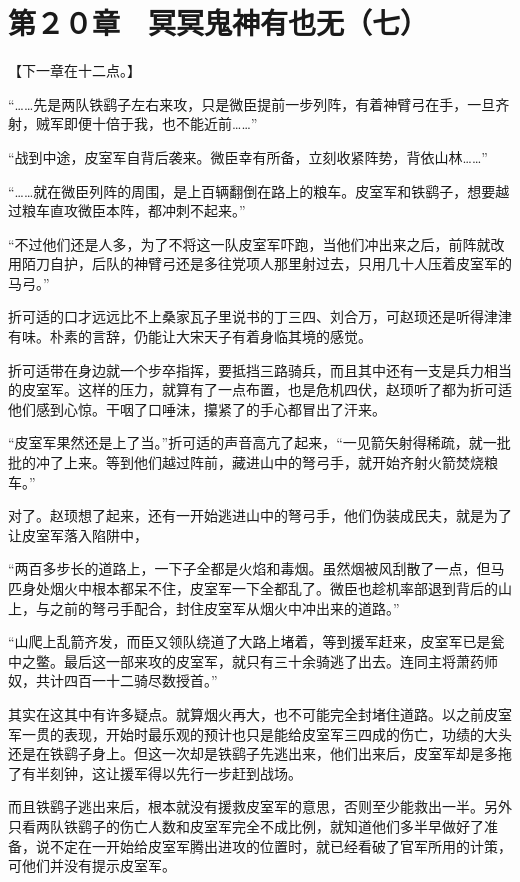 \section{第２０章　冥冥鬼神有也无（七）}

【下一章在十二点。】

“……先是两队铁鹞子左右来攻，只是微臣提前一步列阵，有着神臂弓在手，一旦齐射，贼军即便十倍于我，也不能近前……”

“战到中途，皮室军自背后袭来。微臣幸有所备，立刻收紧阵势，背依山林……”

“……就在微臣列阵的周围，是上百辆翻倒在路上的粮车。皮室军和铁鹞子，想要越过粮车直攻微臣本阵，都冲刺不起来。”

“不过他们还是人多，为了不将这一队皮室军吓跑，当他们冲出来之后，前阵就改用陌刀自护，后队的神臂弓还是多往党项人那里射过去，只用几十人压着皮室军的马弓。”

折可适的口才远远比不上桑家瓦子里说书的丁三四、刘合万，可赵顼还是听得津津有味。朴素的言辞，仍能让大宋天子有着身临其境的感觉。

折可适带在身边就一个步卒指挥，要抵挡三路骑兵，而且其中还有一支是兵力相当的皮室军。这样的压力，就算有了一点布置，也是危机四伏，赵顼听了都为折可适他们感到心惊。干咽了口唾沫，攥紧了的手心都冒出了汗来。

“皮室军果然还是上了当。”折可适的声音高亢了起来，“一见箭矢射得稀疏，就一批批的冲了上来。等到他们越过阵前，藏进山中的弩弓手，就开始齐射火箭焚烧粮车。”

对了。赵顼想了起来，还有一开始逃进山中的弩弓手，他们伪装成民夫，就是为了让皮室军落入陷阱中，

“两百多步长的道路上，一下子全都是火焰和毒烟。虽然烟被风刮散了一点，但马匹身处烟火中根本都呆不住，皮室军一下全都乱了。微臣也趁机率部退到背后的山上，与之前的弩弓手配合，封住皮室军从烟火中冲出来的道路。”

“山爬上乱箭齐发，而臣又领队绕道了大路上堵着，等到援军赶来，皮室军已是瓮中之鳖。最后这一部来攻的皮室军，就只有三十余骑逃了出去。连同主将萧药师奴，共计四百一十二骑尽数授首。”

其实在这其中有许多疑点。就算烟火再大，也不可能完全封堵住道路。以之前皮室军一贯的表现，开始时最乐观的预计也只是能给皮室军三四成的伤亡，功绩的大头还是在铁鹞子身上。但这一次却是铁鹞子先逃出来，他们出来后，皮室军却是多拖了有半刻钟，这让援军得以先行一步赶到战场。

而且铁鹞子逃出来后，根本就没有援救皮室军的意思，否则至少能救出一半。另外只看两队铁鹞子的伤亡人数和皮室军完全不成比例，就知道他们多半早做好了准备，说不定在一开始给皮室军腾出进攻的位置时，就已经看破了官军所用的计策，可他们并没有提示皮室军。

